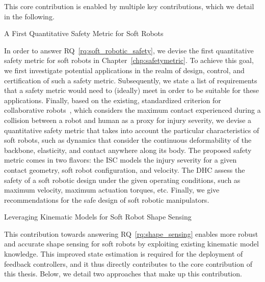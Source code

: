 This core contribution is enabled by multiple key contributions, which we detail in the following.

\begin{contribution}\label{contrib:safety_metric}
    A First Quantitative Safety Metric for Soft Robots
\end{contribution}
In order to answer \gls{RQ}~\ref{rq:soft_robotic_safety}, we devise the first quantitative safety metric for soft robots in Chapter~\ref{chp:safetymetric}.
To achieve this goal, we first investigate potential applications in the realm of design, control, and certification of such a safety metric. Subsequently, we state a list of requirements that a safety metric would need to (ideally) meet in order to be suitable for these applications.
Finally, based on the existing, standardized criterion for collaborative robots~\cite{Isots_15066_2016}, which considers the maximum contact experienced during a collision between a robot and human as a proxy for injury severity, we devise a quantitative safety metric that takes into account the particular characteristics of soft robots, such as dynamics that consider the continuous deformability of the backbone, elasticity, and contact anywhere along its body.
The proposed safety metric comes in two flavors: the \gls{ISC} models the injury severity for a given contact geometry, soft robot configuration, and velocity. The \gls{DHC} assess the safety of a soft robotic design under the given operating conditions, such as maximum velocity, maximum actuation torques, etc.
Finally, we give recommendations for the safe design of soft robotic manipulators.

\begin{contribution}\label{contrib:kinematic_models_shape_sensing}
    Leveraging Kinematic Models for Soft Robot Shape Sensing    
\end{contribution}
This contribution towards answering \gls{RQ}~\ref{rq:shape_sensing} enables more robust and accurate shape sensing for soft robots by exploiting existing kinematic model knowledge. This improved state estimation is required for the deployment of feedback controllers, and it thus directly contributes to the core contribution of this thesis.
Below, we detail two approaches that make up this contribution.

